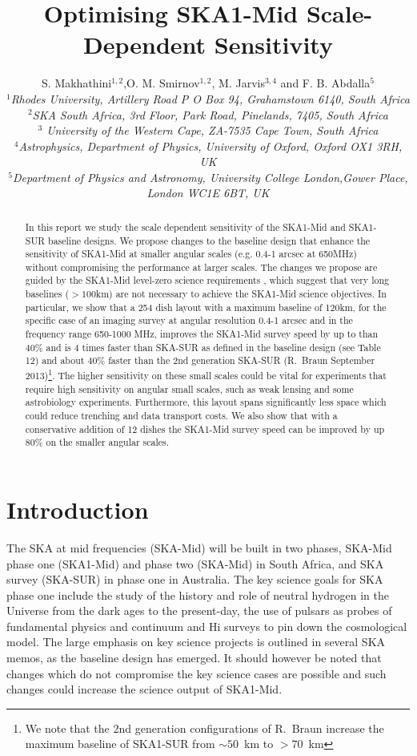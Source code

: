\documentclass[sfheadings,a4paper,times,9pt,floats,floatfix]{article}
\title{Optimising SKA1-Mid Scale-Dependent Sensitivity}
\author{S. Makhathini$^{1,2}$,O. M. Smirnov$^{1,2}$, M. Jarvis$^{3,4}$ and F. B. Abdalla$^5$ \\{\footnotesize \it $^1$Rhodes
University, Artillery Road P O Box 94, Grahamstown 6140, South Africa} \\{ \footnotesize \it $^2$SKA South Africa, 3rd Floor,
Park Road, Pinelands, 7405, South Africa} \\{\footnotesize \it $^3$ University of the Western Cape, ZA-7535 Cape Town, South
Africa}\\ {\footnotesize \it $^4$Astrophysics, Department of Physics, University of Oxford, Oxford OX1 3RH, UK} \\ {\footnotesize \it $^5$Department of Physics
and Astronomy, University College London,Gower Place, London WC1E 6BT, UK}}
\begin{document}
\maketitle
\begin{abstract}
In this report we study the scale dependent sensitivity of the SKA1-Mid and SKA1-SUR baseline designs. We propose
changes to the baseline design that enhance the sensitivity of SKA1-Mid at smaller angular scales (e.g. 0.4-1 arcsec at
650MHz) without compromising the performance at larger scales. The changes we propose are guided by the SKA1-Mid
level-zero science requirements \cite{srd}, which suggest that very long baselines ($>100$km) are not necessary to
achieve the SKA1-Mid science objectives. In particular, we show that a 254 dish layout with a maximum baseline of 120km,
for the specific case of an imaging survey at angular resolution 0.4-1 arcsec and in the frequency range 650-1000 MHz,
improves the SKA1-Mid survey speed by up to than 40\% and is 4 times faster than SKA-SUR as defined in the baseline
design (see Table 12) and about 40\% faster than the 2nd generation SKA-SUR (R.~Braun September 2013)\footnote{We note
that the 2nd generation configurations of R.~Braun increase the maximum baseline of SKA1-SUR from $\sim 50$~km
to $>70$~km}. The higher sensitivity on these small scales could be vital for experiments that require high sensitivity
on angular small scales, such as weak lensing and some astrobiology experiments. Furthermore, this layout spans
significantly less space which could reduce trenching and data transport costs. We also show that with a conservative
addition of 12 dishes the SKA1-Mid survey speed can be improved by up 80\% on the
smaller angular scales.

\end{abstract}

\section{Introduction}
The SKA at mid frequencies (SKA-Mid) will be built in two phases, SKA-Mid phase one (SKA1-Mid) and phase two (SKA-Mid)
in South Africa, and SKA survey (SKA-SUR) in phase one in Australia. The key science goals for SKA phase one include the
study of the history and role of neutral hydrogen in the Universe from the dark ages to the present-day, the use of
pulsars as probes of fundamental physics \cite{bd} and continuum and H{\sc i} surveys to pin down the cosmological
model. The large emphasis on key science projects is outlined in several SKA memos, as the baseline design has emerged.
It should however be noted that changes which do not compromise the key science cases are possible and such changes
could increase the science output of SKA1-Mid.
\end{document}
